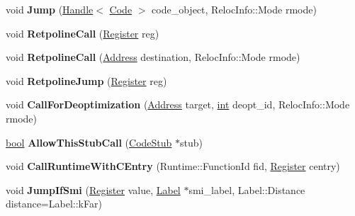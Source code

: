 \begin{DoxyCompactItemize}
void {\bfseries Jump} (\mbox{\hyperlink{classv8_1_1internal_1_1Handle}{Handle}}$<$ \mbox{\hyperlink{classv8_1_1internal_1_1Code}{Code}} $>$ code\+\_\+object, Reloc\+Info\+::\+Mode rmode)
\item 
\mbox{\label{classv8_1_1internal_1_1TurboAssembler_a2d59ed4d2e98e7f1d03809bba8820d03}} 
void {\bfseries Retpoline\+Call} (\mbox{\hyperlink{classv8_1_1internal_1_1Register}{Register}} reg)
\item 
\mbox{\label{classv8_1_1internal_1_1TurboAssembler_a49a2689540115fa18d706b746b02c281}} 
void {\bfseries Retpoline\+Call} (\mbox{\hyperlink{classuintptr__t}{Address}} destination, Reloc\+Info\+::\+Mode rmode)
\item 
\mbox{\label{classv8_1_1internal_1_1TurboAssembler_a1bbadd6c0afeea9eab35a7e8508444cb}} 
void {\bfseries Retpoline\+Jump} (\mbox{\hyperlink{classv8_1_1internal_1_1Register}{Register}} reg)
\item 
\mbox{\label{classv8_1_1internal_1_1TurboAssembler_a8fe9aeaba65f21a5f48bbf9ad66fa18d}} 
void {\bfseries Call\+For\+Deoptimization} (\mbox{\hyperlink{classuintptr__t}{Address}} target, \mbox{\hyperlink{classint}{int}} deopt\+\_\+id, Reloc\+Info\+::\+Mode rmode)
\item 
\mbox{\label{classv8_1_1internal_1_1TurboAssembler_a20348b464d89447388016d14eb6cb7e3}} 
\mbox{\hyperlink{classbool}{bool}} {\bfseries Allow\+This\+Stub\+Call} (\mbox{\hyperlink{classv8_1_1internal_1_1CodeStub}{Code\+Stub}} $\ast$stub)
\item 
\mbox{\label{classv8_1_1internal_1_1TurboAssembler_a402a6ba1a950da97bcbbf500be586951}} 
void {\bfseries Call\+Runtime\+With\+C\+Entry} (Runtime\+::\+Function\+Id fid, \mbox{\hyperlink{classv8_1_1internal_1_1Register}{Register}} centry)
\item 
\mbox{\label{classv8_1_1internal_1_1TurboAssembler_af54c6690df6da5596dea1e392b55e2ac}} 
void {\bfseries Jump\+If\+Smi} (\mbox{\hyperlink{classv8_1_1internal_1_1Register}{Register}} value, \mbox{\hyperlink{classv8_1_1internal_1_1Label}{Label}} $\ast$smi\+\_\+label, Label\+::\+Distance distance=Label\+::k\+Far)

\end{DoxyCompactItemize}
